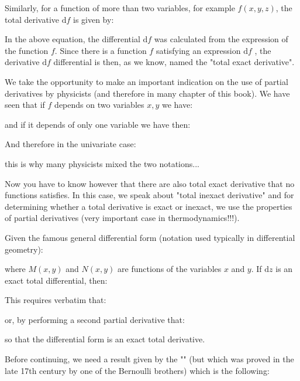 	\begin{tcolorbox}[title=Remark,colframe=black,arc=10pt]
Similarly, for a function of more than two variables, for example $f(x,y,z)$, the total derivative $\mathrm{d}f$ is given by:
	
	In the above equation, the differential $\mathrm{d}f$  was calculated from the expression of the function $f$. Since there is a function $f$ satisfying an expression $\mathrm{d}f$ , the derivative $\mathrm{d}f$  differential is then, as we know, named the "total exact derivative".
	\end{tcolorbox}	
	
	We take the opportunity to make an important indication on the use of partial derivatives by physicists (and therefore in many chapter of this book). We have seen that if $f$ depends on two variables $x, y$ we have:
	
	and if it depends of only one variable we have then:
	
	And therefore in the univariate case:
	
	this is why many physicists mixed the two notations...
	
	Now you have to know however that there are also total exact derivative that no functions satisfies. In this case, we speak about "total inexact derivative" and for determining whether a total derivative is exact or inexact, we use the properties of partial derivatives (very important case in thermodynamics!!!).
	
	Given the famous general differential form (notation used typically in differential geometry):
	
	where $M (x, y)$ and $N (x, y)$ are functions of the variables $x$ and $y$. If $\mathrm{d}z$ is an exact total differential, then:
	
	This requires verbatim that:
	
	or, by performing a second partial derivative that:
	
	so that the differential form is an exact total derivative.
	
	Before continuing, we need a result given by the "" (but which was proved in the late 17th century by one of the Bernoulli brothers) which is the following:
	
